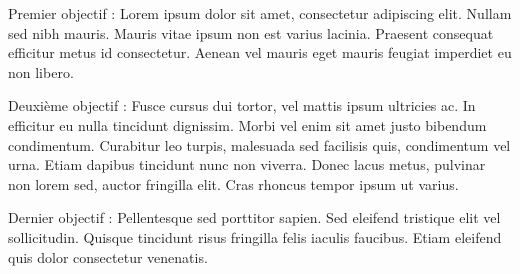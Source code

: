 \item Premier objectif : Lorem ipsum dolor sit amet, consectetur adipiscing elit. Nullam sed nibh mauris. Mauris vitae ipsum non est varius lacinia. Praesent consequat efficitur metus id consectetur. Aenean vel mauris eget mauris feugiat imperdiet eu non libero. 
\item Deuxième objectif : Fusce cursus dui tortor, vel mattis ipsum ultricies ac. In efficitur eu nulla tincidunt dignissim. Morbi vel enim sit amet justo bibendum condimentum. Curabitur leo turpis, malesuada sed facilisis quis, condimentum vel urna. Etiam dapibus tincidunt nunc non viverra. Donec lacus metus, pulvinar non lorem sed, auctor fringilla elit. Cras rhoncus tempor ipsum ut varius. 
\item Dernier objectif : Pellentesque sed porttitor sapien. Sed eleifend tristique elit vel sollicitudin. Quisque tincidunt risus fringilla felis iaculis faucibus. Etiam eleifend quis dolor consectetur venenatis.